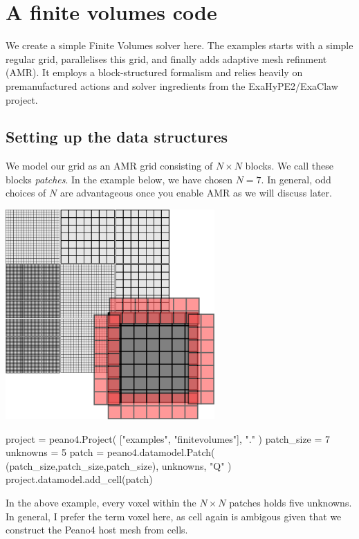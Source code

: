 \chapter{A finite volumes code}
\label{section:python-api-examples:finite-volumes}

We create a simple Finite Volumes solver here.
The examples starts with a simple regular grid, parallelises this grid, and
finally adds adaptive mesh refinment (AMR).
It employs a block-structured formalism and relies heavily on premanufactured
actions and solver ingredients from the ExaHyPE2/ExaClaw project.


\section{Setting up the data structures}

We model our grid as an AMR grid consisting of $N \times N$ blocks.
We call these blocks \emph{patches}.
In the example below, we have chosen $N=7$.
In general, odd choices of $N$ are advantageous once you enable AMR as we will
discuss later.

\begin{center}
  \includegraphics[width=0.6\textwidth]{42_finite-volumes/block-structured.pdf}
\end{center}

\begin{code}
project = peano4.Project( ["examples", "finitevolumes"], "." )
patch_size = 7
unknowns   = 5
patch = peano4.datamodel.Patch( (patch_size,patch_size,patch_size), unknowns, "Q" )
project.datamodel.add_cell(patch)
\end{code}

\noindent
In the above example, every voxel within the $N \times N$ patches holds five
unknowns.
In general, I prefer the term voxel here, as cell again is ambigous given that
we construct the Peano4 host mesh from cells.


